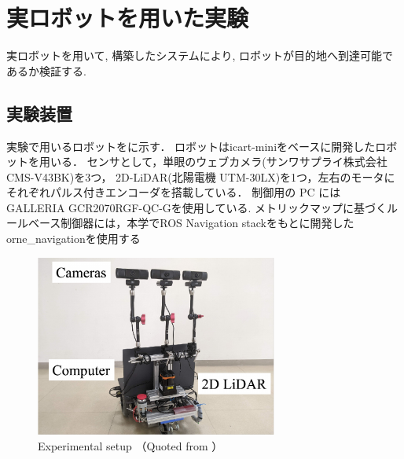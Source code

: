 \section{実ロボットを用いた実験}
実ロボットを用いて, 構築したシステムにより, 
ロボットが目的地へ到達可能であるか検証する.
\subsection{実験装置}
実験で用いるロボットをに示す．
ロボットはicart-mini\cite{icart}をベースに開発したロボットを用いる．
センサとして，単眼のウェブカメラ(サンワサプライ株式会社 CMS-V43BK)を3つ，
2D-LiDAR(北陽電機 UTM-30LX)を1つ，左右のモータにそれぞれパルス付きエンコーダを搭載している．
制御用の PC には GALLERIA GCR2070RGF-QC-Gを使用している.
メトリックマップに基づくルールベース制御器には，本学でROS Navigation stackをもとに開発した
orne\_navigation\cite{orne_nav}を使用する
\begin{figure}[htbp]
    \centering
     \includegraphics[width=80mm]{images/pdf/gamma_sensor.pdf}
     \caption{Experimental setup （Quoted from \cite{haruyama2023}）}\label{fig:gamma}
\end{figure}

\newpage
